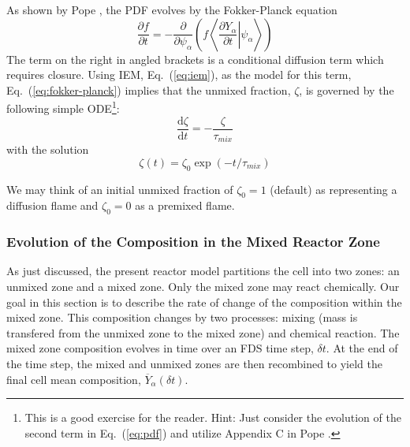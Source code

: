 As shown by Pope \cite{Pope:2000}, the PDF evolves by the Fokker-Planck equation
\begin{equation}
\label{eq:fokker-planck}
\frac{\partial f}{\partial t} = -\frac{\partial}{\partial \psi_\alpha} \left(f \left\langle \left. \frac{\partial Y_\alpha}{\partial t} \right| \psi_\alpha \right\rangle \right)
\end{equation}
The term on the right in angled brackets is a conditional diffusion term which requires closure.  Using IEM, Eq.~(\ref{eq:iem}), as the model for this term, Eq.~(\ref{eq:fokker-planck}) implies that the unmixed fraction, $\zeta$, is governed by the following simple ODE\footnote{This is a good exercise for the reader.  Hint: Just consider the evolution of the second term in Eq.~(\ref{eq:pdf}) and utilize Appendix C in Pope \cite{Pope:2000}.}:
\begin{equation}\label{eq:zeta}
\frac{\mbox{d}\zeta}{\mbox{d}t}=-\frac{\zeta}{\tau_{mix}}
\end{equation}
with the solution
\begin{equation}\label{eq:zeta_soln}
\zeta(t) = \zeta_0 \exp(-t/\tau_{mix})
\end{equation}

We may think of an initial unmixed fraction of $\zeta_0=1$ (default) as representing a diffusion flame and $\zeta_0=0$ as a premixed flame.


\subsubsection{Evolution of the Composition in the Mixed Reactor Zone}

As just discussed, the present reactor model partitions the cell into two zones: an unmixed zone and a mixed zone.  Only the mixed zone may react chemically.  Our goal in this section is to describe the rate of change of the composition within the mixed zone.  This composition changes by two processes: mixing (mass is transfered from the unmixed zone to the mixed zone) and chemical reaction.  The mixed zone composition evolves in time over an FDS time step, $\delta t$.  At the end of the time step, the mixed and unmixed zones are then recombined to yield the final cell mean composition, $\overline{Y}_\alpha(\delta t)$.

